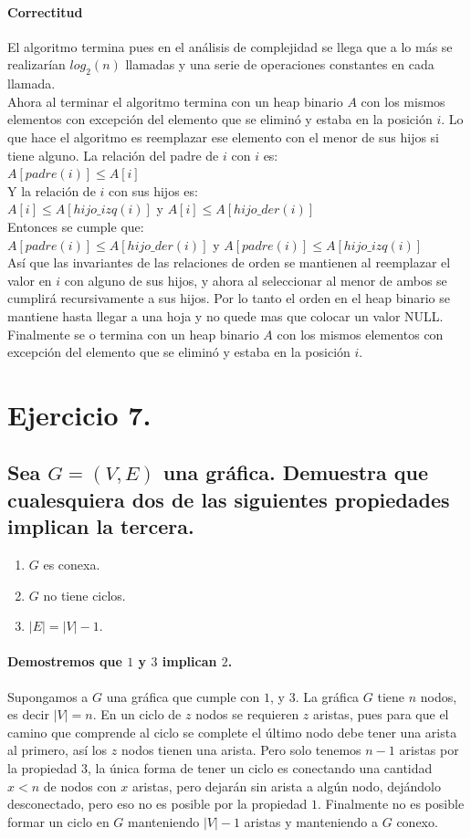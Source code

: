 \documentclass[12pt]{article}
\begin{document}
\paragraph{Correctitud} El algoritmo termina pues en el análisis de complejidad se llega que a lo más se realizarían $log_2(n)$ llamadas y una serie de operaciones constantes en cada llamada.\\
Ahora al terminar el algoritmo termina con un heap binario $A$ con los mismos elementos con excepción del elemento que se eliminó y estaba en la posición $i$. Lo que hace el algoritmo es reemplazar ese elemento con el menor de sus hijos si tiene alguno. La relación del padre de $i$ con $i$ es: \\
$A[padre(i)] \leq A[i]$\\
Y la relación de $i$ con sus hijos es:\\
$A[i] \leq A[hijo\_izq(i)]$ y  $A[i] \leq A[hijo\_der(i)]$\\
Entonces se cumple que:\\
$A[padre(i)] \leq A[hijo\_der(i)]$ y $A[padre(i)] \leq A[hijo\_izq(i)]$\\
Así que las invariantes de las  relaciones de orden se mantienen al reemplazar el valor en $i$ con alguno de sus hijos, y ahora al seleccionar al menor de ambos se cumplirá recursivamente a sus hijos.
Por lo tanto el orden en el heap binario se mantiene hasta llegar a una hoja y no quede mas que colocar un valor NULL. Finalmente se o termina con un heap binario $A$ con los mismos elementos con excepción del elemento que se eliminó y estaba en la posición $i$.
\pagebreak
\section{Ejercicio 7.}
\subsection{Sea $G=(V,E)$ una gráfica. Demuestra que cualesquiera dos de las siguientes propiedades implican la tercera.}
\begin{enumerate}
	\item $G$ es conexa.
	\item $G$ no tiene ciclos.
	\item $|E| = |V| - 1$.
\end{enumerate}
\paragraph{Demostremos que $1$ y $3$ implican $2$.}
Supongamos a $G$ una gráfica que cumple con $1$, y $3$. La gráfica $G$ tiene $n$ nodos, es decir $|V| = n$. En un ciclo de $z$ nodos se requieren $z$ aristas, pues para que el camino que comprende al ciclo se complete el último nodo debe tener una arista al primero, así los $z$ nodos tienen una arista. Pero solo tenemos $n - 1$ aristas por la propiedad $3$, la única forma de tener un ciclo es conectando una cantidad $x<n$ de nodos con $x$ aristas, pero dejarán sin arista a algún nodo, dejándolo  desconectado, pero eso no es posible por la propiedad $1$. Finalmente no es posible formar un ciclo en $G$ manteniendo $|V| - 1$ aristas y manteniendo a $G$ conexo.
\end{document}

